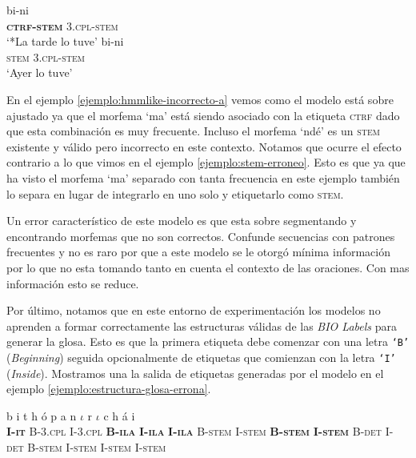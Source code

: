 \documentclass[letterpaper,12pt,oneside]{book}
\def\code#1{\texttt{#1}}
\theoremstyle{definition}
\begin{document}
\begin{exe}
    \ex \begin{xlist}
        \ex {} {bi-ni}\\
        {\textbf{\textsc{ctrf-stem}}} {\textsc{3.cpl-stem}}\\
        \trans `*La tarde lo tuve' \label{ejemplo:hmmlike-incorrecto-a}
        \ex {} {bi-ni}\\
        {\textsc{stem}} {\textsc{3.cpl-stem}}\\
        \trans `Ayer lo tuve' \label{ejemplo:hmmlike-incorrecto-b}
        \end{xlist}
\end{exe}

En el ejemplo \ref{ejemplo:hmmlike-incorrecto-a} vemos como el modelo está sobre ajustado ya que el morfema `ma' está siendo asociado con la etiqueta \textsc{ctrf} dado que esta combinación es muy frecuente. Incluso el morfema `ndé' es un \textsc{stem} existente y válido pero incorrecto en este contexto. Notamos que ocurre el efecto contrario a lo que vimos en el ejemplo \ref{ejemplo:stem-erroneo}. Esto es que ya que ha visto el morfema `ma' separado con tanta frecuencia en este ejemplo también lo separa en lugar de integrarlo en uno solo y etiquetarlo como \textsc{stem}.

Un error característico de este modelo es que esta sobre segmentando y encontrando morfemas que no son correctos. Confunde secuencias con patrones frecuentes y no es raro por que a este modelo se le otorgó mínima información por lo que no esta tomando tanto en cuenta el contexto de las oraciones. Con mas información esto se reduce.

Por último, notamos que en este entorno de experimentación los modelos no aprenden a formar correctamente las estructuras válidas de las \textit{BIO Labels} para generar la glosa. Esto es que la primera etiqueta debe comenzar con una letra \code{`B'} (\textit{Beginning}) seguida opcionalmente de etiquetas que comienzan con la letra \code{`I'} (\textit{Inside}). Mostramos una la salida de etiquetas generadas por el modelo en el ejemplo \ref{ejemplo:estructura-glosa-errona}.

\begin{exe}
    \ex {} {b} {i} {t} {h} {ó} {p} {a} {n} {$\iota$} {r} {$\iota$} {c} {h} {á} {i}\\
    {\textbf{\textsc{I-it}}} {\textsc{B-3.cpl}} {\textsc{I-3.cpl}} {\textbf{\textsc{B-ila}}} {\textbf{\textsc{I-ila}}} {\textbf{\textsc{I-ila}}} {\textsc{B-stem}} {\textsc{I-stem}} {\textbf{\textsc{B-stem}}} {\textbf{\textsc{I-stem}}} {\textsc{B-det}} {\textsc{I-det}} {\textsc{B-stem}} {\textsc{I-stem}} {\textsc{I-stem}}  {\textsc{I-stem}}\\\label{ejemplo:estructura-glosa-errona}
\end{exe}
\end{document}

